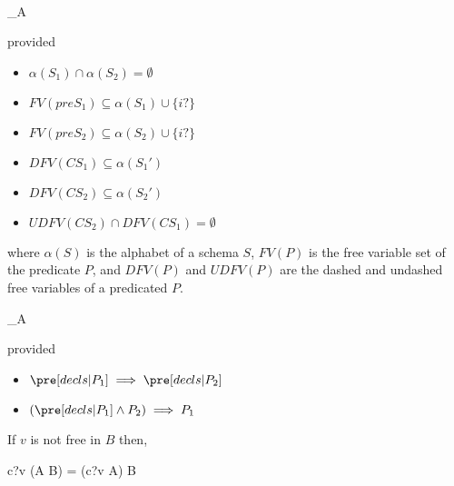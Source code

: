 \begin{law}
  \label{schema-seq-intro-law}
  \begin{circus}
     \\
    \circrefines_A \\
    [\Delta S_1; \Xi S_2; i? : T | preS_1 \land CS_1] 
  \end{circus}
  provided
  \begin{itemize}
  \item $\alpha(S_1) \cap \alpha(S_2) = \emptyset$
  \item $FV(preS_1) \subseteq \alpha(S_1) \cup \{i?\}$
  \item $FV(preS_2) \subseteq \alpha(S_2) \cup \{i?\}$
  \item $DFV(CS_1) \subseteq \alpha(S_1')$
  \item $DFV(CS_2) \subseteq \alpha(S_2')$
  \item $UDFV(CS_2) \cap DFV(CS_1) = \emptyset$
  \end{itemize}
  where $\alpha(S)$ is the alphabet of a schema $S$, $FV(P)$ is the
  free variable set of the predicate $P$, and $DFV(P)$ and $UDFV(P)$
  are the dashed and undashed free variables of a predicated $P$.
\end{law}

\begin{law}
  \label{schema-refinement-law}
  \begin{circus}
    \lschexpract [ decls | P_1 ] \rschexpract
    \circrefines_A
    \lschexpract [ decls | P_2 ] \rschexpract
  \end{circus}
  provided
  \begin{itemize}
  \item $\pre [ decls | P_1 ] \implies \pre [ decls | P_2 ]$
  \item $(\pre [ decls | P_1 ] \land P_2) \implies P_1$
  \end{itemize}
\end{law}

\begin{law}
  \label{input-prefix-seq-assoc-law}
  If $v$ is not free in $B$ then,
  \begin{circus}
    c?v \then (A \circseq B) = (c?v \then A) \circseq B
  \end{circus}
\end{law}


